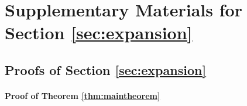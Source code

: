 \documentclass[fleqn,mnsc,nonblindrev]{informs4}
\begin{document}
\bigskip

\section{Supplementary Materials for Section \ref{sec:expansion}}\label{pf:main}
\subsection{Proofs of Section \ref{sec:expansion}}
\paragraph{Proof of Theorem \ref{thm:maintheorem}}
\ 
\end{document}
